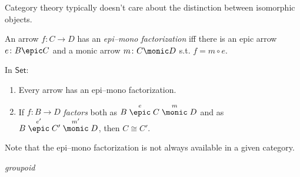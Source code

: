 Category theory typically doesn't care about the distinction between isomorphic objects.




\begin{df}
	An arrow $f \colon C \to D$ has an \textit{epi--mono factorization} iff there is an epic arrow $e \colon B \epic C$ and a monic arrow $m \colon C \monic D$ s.t. $f = m \circ e$.
\end{df}


\begin{center}
\end{center}


\begin{thm} 
	In $\mathsf{Set}$:
	\begin{enumerate}[itemsep=5pt,parsep=5pt,leftmargin=3em,topsep=5pt,label=(\arabic*)] %
		\item 
		Every arrow has an epi--mono factorization.

		\item 
		If $f \colon B \to D$ \textit{factors} both as 
		$B \stackrel{e}{\epic} C \stackrel{m}{\monic} D$ and as 
		$B \stackrel{e'}{\epic} C' \stackrel{m'}{\monic} D$, 
		then $C \cong C'$.
	\end{enumerate}
\begin{center}
\end{center}
\end{thm}



Note that the epi--mono factorization is not always available in a given category. 



\vspace{3em}

\textit{groupoid} 




